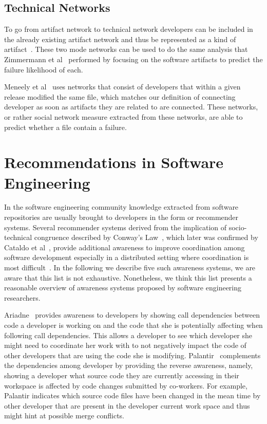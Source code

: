 \subsection{Technical Networks}
\label{chap:6:tn}
To go from artifact network to technical network developers can be included in the already existing artifact network and thus be represented as a kind of artifact~\cite{pinzger:fse:2008}.
These two mode networks can be used to do the same analysis that Zimmermann et al~\cite{zimmermann:esem:2009,zimmermann:icse:2008} performed by focusing on the software artifacts to predict the failure likelihood of each.

Meneely et al~\cite{meneely:fse:2008} uses networks that consist of developers that within a given release modified the same file, which matches our definition of connecting developer as soon as artifacts they are related to are connected.
These networks, or rather social network measure extracted from these networks, are able to predict whether a file contain a failure.









\section{Recommendations in Software Engineering}
In the software engineering community knowledge extracted from software repositories are usually brought to developers in the form or recommender systems.
Several recommender systems derived from the implication of socio-technical congruence described by Conway's Law~\cite{conway:datamination:1968}, which later was confirmed by Cataldo et al~\cite{cataldo:cscw:2006}, provide additional awareness to improve coordination among software development especially in a distributed setting where coordination is most difficult~\cite{olson:hci:2000}.
In the following we describe five such awareness systems, we are aware that this list is not exhaustive. 
Nonetheless, we think this list presents a reasonable overview of awareness systems proposed by software engineering researchers.

Ariadne~\cite{trainer2005:ariadne} provides awareness to developers by showing call dependencies between code a developer is working on and the code that she is potentially affecting when following call dependencies.
This allows a developer to see which developer she might need to coordinate her work with to not negatively impact the code of other developers that are using the code she is modifying.
%
Palantir~\cite{sarma:cscw:2002} complements the dependencies among developer by providing the reverse awareness, namely, showing a developer what source code they are currently accessing in their workspace is affected by code changes submitted by co-workers.
For example, Palantir indicates which source code files have been changed in the mean time by other developer that are present in the developer current work space and thus might hint at possible merge conflicts.

